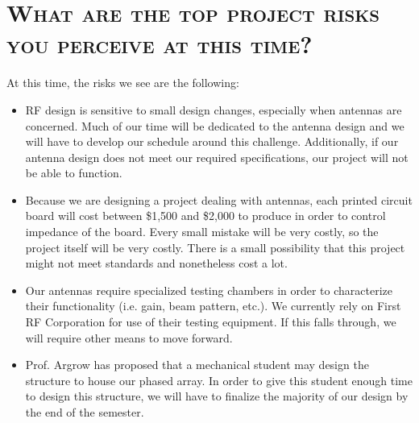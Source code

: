 \documentclass[11pt]{article}
\numberwithin{figure}{section}
\begin{document}
\section{\textsc{What are the top project risks you perceive at this time?}}
	At this time, the risks we see are the following:
	\begin{itemize}
		\item RF design is sensitive to small design changes, especially when antennas are concerned. Much of our time will be dedicated to the antenna design and we will have to develop our schedule around this challenge. Additionally, if our antenna design does not meet our required specifications, our project will not be able to function.
		\item Because we are designing a project dealing with antennas, each printed circuit board will cost between \$1,500 and \$2,000 to produce in order to control impedance of the board. Every small mistake will be very costly, so the project itself will be very costly. There is a small possibility that this project might not meet standards and nonetheless cost a lot.
		\item Our antennas require specialized testing chambers in order to characterize their functionality (i.e. gain, beam pattern, etc.). We currently rely on First RF Corporation for use of their testing equipment. If this falls through, we will require other means to move forward.
		\item Prof. Argrow has proposed that a mechanical student may design the structure to house our phased array. In order to give this student enough time to design this structure, we will have to finalize the majority of our design by the end of the semester. 
	\end{itemize}
\end{document}
